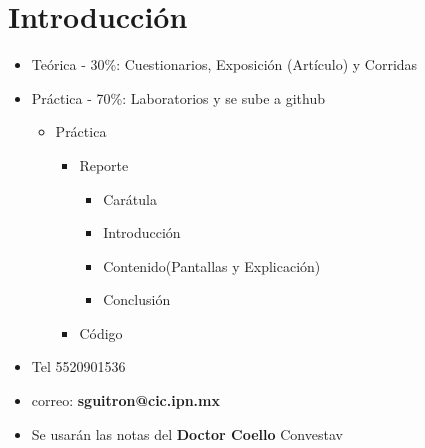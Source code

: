 \documentclass{article}
\begin{document}
\maketitle
\part{Introducción}
\begin{itemize}
	\item Teórica - 30\%: Cuestionarios, Exposición (Artículo) y Corridas
	\item Práctica - 70\%: Laboratorios y se sube a github
	\begin{itemize}
		\item[] Práctica
		\begin{itemize}
			\item[] Reporte
			\begin{itemize}
				\item Carátula
				\item Introducción
				\item Contenido(Pantallas y Explicación)
				\item Conclusión
			\end{itemize}
			\item[] Código
		\end{itemize}
	\end{itemize}
	\item Tel 5520901536
	\item correo: \textbf{sguitron@cic.ipn.mx}
	\item Se usarán las notas del \textbf{Doctor Coello} Convestav
\end{itemize}
\end{document}
